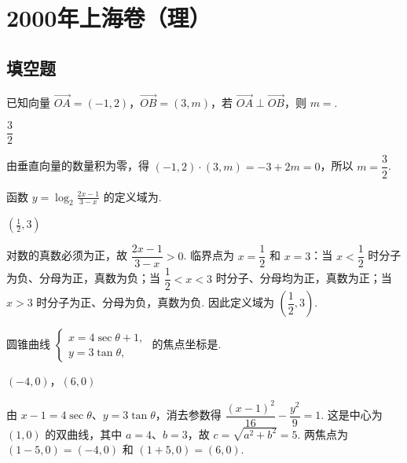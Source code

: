 \chapter{2000年上海卷（理）}

\section{填空题}

\begin{problem}
已知向量 \(\overrightarrow{OA} = (-1, 2)\)，\(\overrightarrow{OB} = (3, m)\)，若 \(\overrightarrow{OA} \perp \overrightarrow{OB}\)，则 \(m = \)\fillinblank{}.
\end{problem}

\begin{answer}
\(\dfrac{3}{2}\)
\end{answer}

\begin{solution}
由垂直向量的数量积为零，得 \((-1,2)\cdot(3,m)=-3+2m=0\)，所以 \(m=\dfrac{3}{2}\).
\end{solution}

\begin{problem}
函数 \( y = \log_2 \frac{2x - 1}{3 - x} \) 的定义域为\fillinblank{}.
\end{problem}

\begin{answer}
\(\left(\frac{1}{2},3\right)\)
\end{answer}

\begin{solution}
对数的真数必须为正，故 \(\dfrac{2x-1}{3-x}>0\). 临界点为 \(x=\dfrac{1}{2}\) 和 \(x=3\)：当 \(x<\dfrac{1}{2}\) 时分子为负、分母为正，真数为负；当 \(\dfrac{1}{2}<x<3\) 时分子、分母均为正，真数为正；当 \(x>3\) 时分子为正、分母为负，真数为负. 因此定义域为 \(\left(\dfrac{1}{2},3\right)\).
\end{solution}

\begin{problem}
圆锥曲线 \(\begin{cases}
x = 4 \sec \theta + 1,\\
y = 3 \tan \theta,
\end{cases}\) 的焦点坐标是\fillinblank{}.
\end{problem}

\begin{answer}
\((-4,0)\)，\((6,0)\)
\end{answer}

\begin{solution}
由 \(x-1=4\sec\theta\)、\(y=3\tan\theta\)，消去参数得 \(\dfrac{(x-1)^2}{16}-\dfrac{y^2}{9}=1\). 这是中心为 \((1,0)\) 的双曲线，其中 \(a=4\)、\(b=3\)，故 \(c=\sqrt{a^2+b^2}=5\). 两焦点为 \((1-5,0)=(-4,0)\) 和 \((1+5,0)=(6,0)\).
\end{solution}

